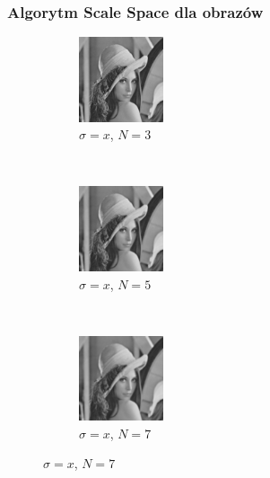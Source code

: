\begin{frame}
	\frametitle{Algorytm Scale Space dla obrazów}


	\begin{figure}[h]
		\begin{center}
			\begin{subfigure}[b]{3cm}
				\centering
				\includegraphics[width=2.5cm]{Lena_scales1.jpg}
				\caption{$\sigma = x$, $N = 3$}
			\end{subfigure}
			~
			\begin{subfigure}[b]{3cm}
				\centering
				\includegraphics[width=2.5cm]{Lena_scales2.jpg}
				\caption{$\sigma = x$, $N = 5$}
			\end{subfigure}
			~
			\begin{subfigure}[b]{3cm}
				\centering
				\includegraphics[width=2.5cm]{Lena_scales3.jpg}
				\caption{$\sigma = x$, $N = 7$}
			\end{subfigure}



\end{center}
\end{figure}
\end{frame}
